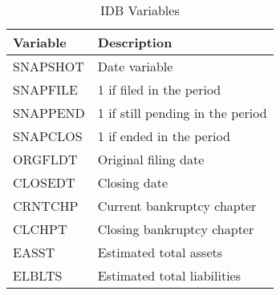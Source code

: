 \documentclass[12pt]{article}
\begin{document}
\begin{table}[h!]
    \centering
    \caption{IDB Variables}
    \label{tab:IDB}
    \begin{tabular}{ll}
    \toprule
    Variable & Description \\ 
    \midrule
    SNAPSHOT & Date variable \\ 
    SNAPFILE & 1 if filed in the period \\ 
    SNAPPEND & 1 if still pending in the period \\ 
    SNAPCLOS & 1 if ended in the period \\ 
    ORGFLDT & Original filing date \\ 
    CLOSEDT & Closing date \\ 
    CRNTCHP & Current bankruptcy chapter \\ 
    CLCHPT & Closing bankruptcy chapter \\ 
    EASST & Estimated total assets \\ 
    ELBLTS & Estimated total liabilities \\ 
    \bottomrule
  \end{tabular}
\end{table}
    
\end{document}

